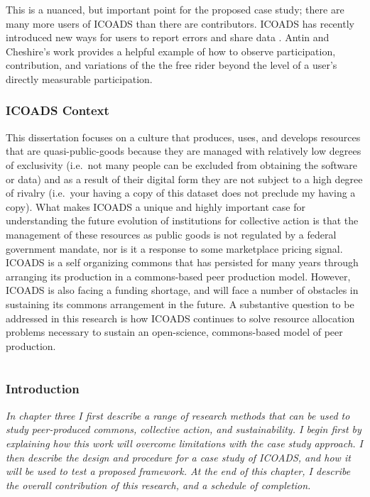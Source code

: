 \documentclass[thesis,tocnosub,noragright,centerchapter,12pt]{uiucecethesis09}
\begin{document}
This is a nuanced, but important point for the proposed case study; there are many
more users of ICOADS than there are contributors. ICOADS has recently
introduced new ways for users to report errors and share data \citep{smith2014icoads}. Antin and Cheshire's work provides a helpful example of how to observe participation, contribution, and variations of the the free
rider beyond the level of a user's directly measurable participation.\\

\subsection*{ICOADS Context}

This dissertation focuses on a culture that produces, uses, and
develops resources that are quasi-public-goods because they are managed
with relatively low degrees of exclusivity (i.e.~not many people can be
excluded from obtaining the software or data) and as a result of their
digital form they are not subject to a high degree of rivalry (i.e.~your
having a copy of this dataset does not preclude my having a copy). What
makes ICOADS a unique and highly important case for understanding the
future evolution of institutions for collective action is that the
management of these resources as public goods is not regulated by a federal
government mandate, nor is it a response to some marketplace pricing
signal. ICOADS is a self organizing commons that has persisted for many
years through arranging its production in a commons-based peer
production model. However, ICOADS is also facing a funding shortage, and will face a
number of obstacles in sustaining its commons arrangement in the future.
A substantive question to be addressed in this research is how ICOADS
continues to solve resource allocation problems necessary to sustain an
open-science, commons-based model of peer production.\\ 

\chapter{}

\subsection*{Introduction}

\emph{In chapter three I first describe a range of research methods that
can be used to study peer-produced commons, collective action, and
sustainability. I begin first by explaining how this work will overcome
limitations with the case study approach. I then describe the design and
procedure for a case study of ICOADS, and how it will be used to test a
proposed framework. At the end of this chapter, I describe the overall contribution of this research, and a
schedule of completion.}\\
\end{document}
